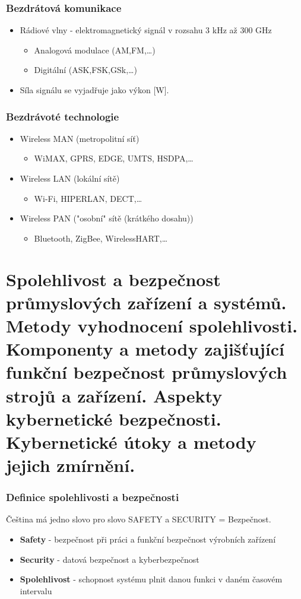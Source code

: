 \subsubsection*{Bezdrátová komunikace}
\begin{itemize}
    \item Rádiové vlny - elektromagnetický signál v rozsahu 3 kHz až 300 GHz \begin{itemize}
              \item Analogová modulace (AM,FM,\dots)
              \item Digitální (ASK,FSK,GSk,\dots)
          \end{itemize}
    \item Síla signálu se vyjadřuje jako výkon [W].
\end{itemize}

\subsubsection*{Bezdrávoté technologie}
\begin{itemize}
    \item Wireless MAN (metropolitní síť) \begin{itemize}
              \item WiMAX, GPRS, EDGE, UMTS, HSDPA,\dots
          \end{itemize}
    \item Wireless LAN (lokální sítě) \begin{itemize}
              \item Wi-Fi, HIPERLAN, DECT,\dots
          \end{itemize}
    \item Wireless PAN ("osobní" sítě (krátkého dosahu)) \begin{itemize}
              \item Bluetooth, ZigBee, WirelessHART,\dots
          \end{itemize}
\end{itemize}

\section{Spolehlivost a bezpečnost průmyslových zařízení a systémů. Metody vyhodnocení spolehlivosti. Komponenty a metody zajišťující funkční bezpečnost průmyslových strojů a zařízení. Aspekty kybernetické bezpečnosti. Kybernetické útoky a metody jejich zmírnění.}

\subsubsection*{Definice spolehlivosti a bezpečnosti}
Čeština má jedno slovo pro slovo SAFETY a SECURITY = Bezpečnost.
\begin{itemize}
    \item \textbf{Safety} - bezpečnost při práci a funkční bezpečnost výrobních zařízení
    \item \textbf{Security} - datová bezpečnost a kyberbezpečnost
    \item \textbf{Spolehlivost} - schopnost systému plnit danou funkci v daném časovém intervalu
\end{itemize}

